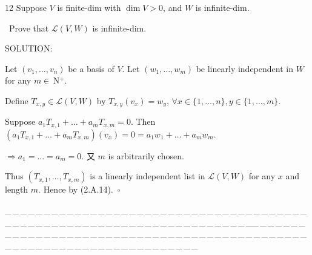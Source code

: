\documentclass[a4paper, 11pt, UTF8]{article}
\def\Lm{\mathcal{L}}
\def\Nbp{$\,{\timesbf N}$^+}
\begin{document}
\begin{large}
{\timesbf\Large 12} {\timessl\Large 
Suppose $V$ is finite-dim with $\dim V > 0$, and $W$ is infinite-dim.}\par\quad\,
{\timessl\Large Prove that $\Lm(V, W)$ is infinite-dim.
}\par
{\timesbf S\footnotesize{OLUTION:}}\par\quad
Let $(v_1,\dots,v_n)$ be a basis of $V$. Let $(w_1,\dots,w_m)$ be linearly independent in $W$ for any $m\in\Nbp$.\par\quad
Define $T_{x,y}\in\Lm(V,W)$ by $T_{x,y}(v_x)=w_y$, $\forall x\in\{1,\dots,n\},y\in\{1,\dots,m\}$.\par\quad
Suppose $a_1 T_{x,1}+\dots+a_m T_{x,m}=0$. Then $(a_1 T_{x,1}+\dots+a_m T_{x,m})(v_x)=0=a_1 w_1+\dots+a_m w_m.$\par\quad
$\Rightarrow a_1=\dots=a_m=0.$ 又 $m$ is arbitrarily chosen.\par\quad
Thus $(T_{x,1},\dots,T_{x,m})$ is a linearly independent list in $\Lm(V,W)$ for any $x$ and length $m$. Hence by (2.A.14).$\,\,\,\square$\par
{\tiny \_\,\_\,\_\,\_\,\_\,\_\,\_\,\_\,\_\,\_\,\_\,\_\,\_\,\_\,\_\,\_\,\_\,\_\,\_\,\_\,\_\,\_\,\_\,\_\,\_\,\_\,\_\,\_\,\_\,\_\,\_\,\_\,\_\,\_\,\_\,\_\,\_\,\_\,\_\,\_\,\_\,\_\,\_\,\_\,\_\,\_\,\_\,\_\,\_\,\_\,\_\,\_\,\_\,\_\,\_\,\_\,\_\,\_\,\_\,\_\,\_\,\_\,\_\,\_\,\_\,\_\,\_\,\_\,\_\,\_\,\_\_\,\_\,\_\,\_\,\_\,\_\,\_\,\_\,\_\,\_\,\_\,\_\,\_\,\_\,\_\,\_\,\_\,\_\,\_\,\_\,\_\,\_\,\_\,\_\,\_\,\_\,\_\,\_\,\_\,\_\,\_\,\_\,\_\,\_\,\_\,\_\,\_\,\_\,\_\,\_\,\_\,\_\,\_\,\_\,\_\,\_\,\_\,\_\,\_\,\_\,\_\,\_\,\_\,\_\,\_\,\_\,\_\,\_\,\_\,\_\,\_\,\_\,\_\,\_\,\_\,\_\,\_\,\_\,\_\,\_\,\_}{\tiny\,\par}


\end{large}
\end{document}
